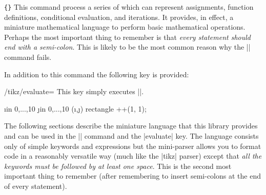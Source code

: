 \begin{command}{\tikzmath\texttt{\{}\texttt{\}}}
    This command process  a series of  which can represent
    assignments, function definitions, conditional evaluation, and iterations.
    It provides, in effect, a miniature mathematical language to perform basic
    mathematical operations. Perhaps the most important thing to remember is
    that \emph{every statement should end with a semi-colon}. This is likely to
    be the most common reason why the |\tikzmath| command fails.
\begin{codeexample}[preamble={\usetikzlibrary{math}}]
\end{codeexample}
\end{command}

In addition to this command the following key is provided:

\begin{key}{/tikz/evaluate={}}
    This key simply executes ||.
\begin{codeexample}[preamble={\usetikzlibrary{math}}]
\tikz[x=0.25cm,y=0.25cm,
  evaluate={
    int \i, \j;
    for \i in {0,...,10} {
      for \j in {0,...,10} {
        \a{\i,\j} = (\i+\j)*5;
      };
    };
  }
]
\foreach \i in {0,...,10}
  \foreach \j in {0,...,10}
      (\i,\j) rectangle ++(1, 1);
\end{codeexample}
\end{key}

The following sections describe the miniature language that this library
provides and can be used in the |\tikzmath| command and the |evaluate| key.
The language consists only of simple keywords and expressions but the
mini-parser allows you to format code in a reasonably versatile way (much like
the |tikz| parser) except that \emph{all the keywords must be followed by at
least one space}. This is the second most important thing to remember (after
remembering to insert semi-colons at the end of every statement).


